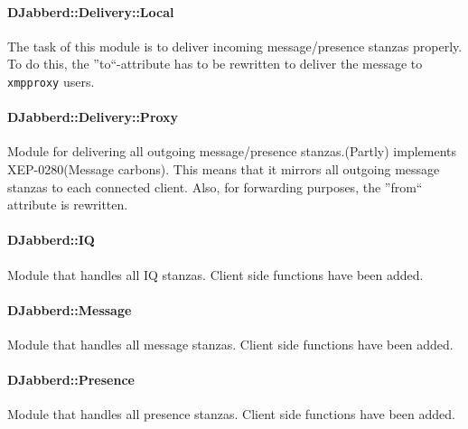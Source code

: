 \documentclass[a4paper,10pt,numbers=noendperiod]{scrartcl}
\begin{document}
	\paragraph{DJabberd::Delivery::Local}
	The task of this module is to deliver incoming message/presence stanzas properly. To do this, the ''to``-attribute has to be rewritten to deliver the message to \texttt{xmpproxy} users.
	\paragraph{DJabberd::Delivery::Proxy}
	Module for delivering all outgoing message/presence stanzas.(Partly) implements XEP-0280(Message carbons). This means that it mirrors all outgoing message stanzas to each connected client. Also, for forwarding purposes, the ''from`` attribute is rewritten.
	\paragraph{DJabberd::IQ}
	Module that handles all IQ stanzas. Client side functions have been added.
	\paragraph{DJabberd::Message}
	Module that handles all message stanzas. Client side functions have been added.
	\paragraph{DJabberd::Presence}
	Module that handles all presence stanzas. Client side functions have been added.
\newpage
\end{document}
